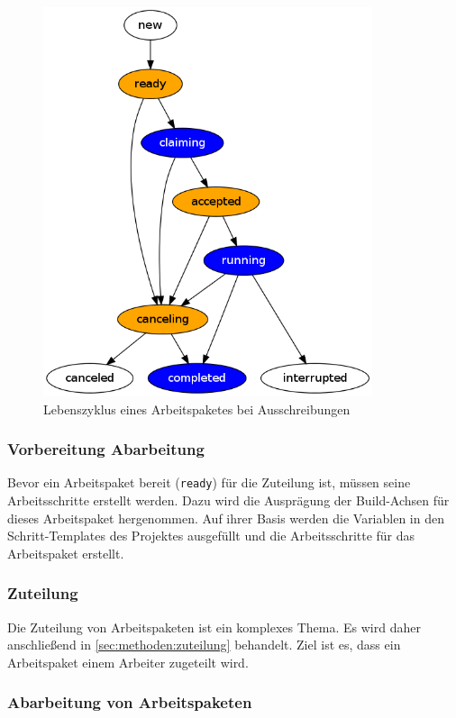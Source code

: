 \begin{figure}[ht] 
  \centering
  \includegraphics[height=4.5in]{imageinput/lebenszyklus-arbeitspaket.png}
  \caption{Lebenszyklus eines Arbeitspaketes bei Ausschreibungen}
  \label{fig:lebenszyklus-arbeitspaket}
\end{figure}


\subsubsection{Vorbereitung Abarbeitung}

Bevor ein Arbeitspaket bereit (\verb|ready|) für die Zuteilung ist,
müssen seine Arbeitsschritte erstellt werden.
Dazu wird die Ausprägung der Build-Achsen für dieses Arbeitspaket hergenommen.
Auf ihrer Basis werden die Variablen in den Schritt-Templates des Projektes
ausgefüllt und die Arbeitsschritte für das Arbeitspaket erstellt. 

\subsubsection{Zuteilung}

Die Zuteilung von Arbeitspaketen ist ein komplexes Thema.
Es wird daher anschließend in \cref{sec:methoden:zuteilung} behandelt.
Ziel ist es, dass ein Arbeitspaket einem Arbeiter zugeteilt wird.

\subsubsection{Abarbeitung von Arbeitspaketen}


